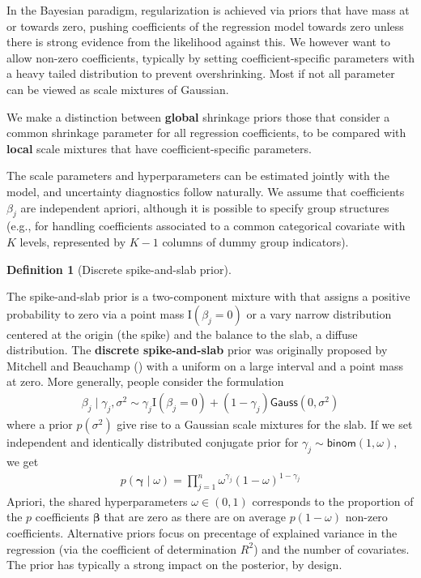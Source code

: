 \documentclass[
  11pt,
  letterpaper,
]{scrbook}
\theoremstyle{definition}
\theoremstyle{plain}
\theoremstyle{plain}
\theoremstyle{plain}
\theoremstyle{definition}
\theoremstyle{definition}
\newtheorem{definition}{Definition}[chapter]
\theoremstyle{plain}
\theoremstyle{plain}
\theoremstyle{remark}
\begin{document}
In the Bayesian paradigm, regularization is achieved via priors that
have mass at or towards zero, pushing coefficients of the regression
model towards zero unless there is strong evidence from the likelihood
against this. We however want to allow non-zero coefficients, typically
by setting coefficient-specific parameters with a heavy tailed
distribution to prevent overshrinking. Most if not all parameter can be
viewed as scale mixtures of Gaussian.

We make a distinction between \textbf{global} shrinkage priors those
that consider a common shrinkage parameter for all regression
coefficients, to be compared with \textbf{local} scale mixtures that
have coefficient-specific parameters.

The scale parameters and hyperparameters can be estimated jointly with
the model, and uncertainty diagnostics follow naturally. We assume that
coefficients \(\beta_j\) are independent apriori, although it is
possible to specify group structures (e.g., for handling coefficients
associated to a common categorical covariate with \(K\) levels,
represented by \(K-1\) columns of dummy group indicators).

\begin{definition}[Discrete spike-and-slab
prior]\protect\hypertarget{def-spike-slab}{}\label{def-spike-slab}

The spike-and-slab prior is a two-component mixture with that assigns a
positive probability to zero via a point mass \(\mathrm{I}(\beta_j=0)\)
or a vary narrow distribution centered at the origin (the spike) and the
balance to the slab, a diffuse distribution. The \textbf{discrete
spike-and-slab} prior was originally proposed by Mitchell and Beauchamp
() with a uniform on a large
interval and a point mass at zero. More generally, people consider the
formulation \begin{align*}
\beta_j \mid \gamma_j, \sigma^2 \sim \gamma_j \mathrm{I}(\beta_j=0) + (1-\gamma_j)\mathsf{Gauss}(0, \sigma^2)
\end{align*} where a prior \(p(\sigma^2)\) give rise to a Gaussian scale
mixtures for the slab. If we set independent and identically distributed
conjugate prior for \(\gamma_j \sim \mathsf{binom}(1, \omega),\) we get
\begin{align*}
p(\boldsymbol{\gamma} \mid \omega) = \prod_{j=1}^n \omega^{\gamma_j} (1-\omega)^{1-\gamma_j}
\end{align*} Apriori, the shared hyperparameters \(\omega \in (0,1)\)
corresponds to the proportion of the \(p\) coefficients
\(\boldsymbol{\beta}\) that are zero as there are on average
\(p(1-\omega)\) non-zero coefficients. Alternative priors focus on
precentage of explained variance in the regression (via the coefficient
of determination \(R^2\)) and the number of covariates. The prior has
typically a strong impact on the posterior, by design.

\end{definition}
\end{document}
